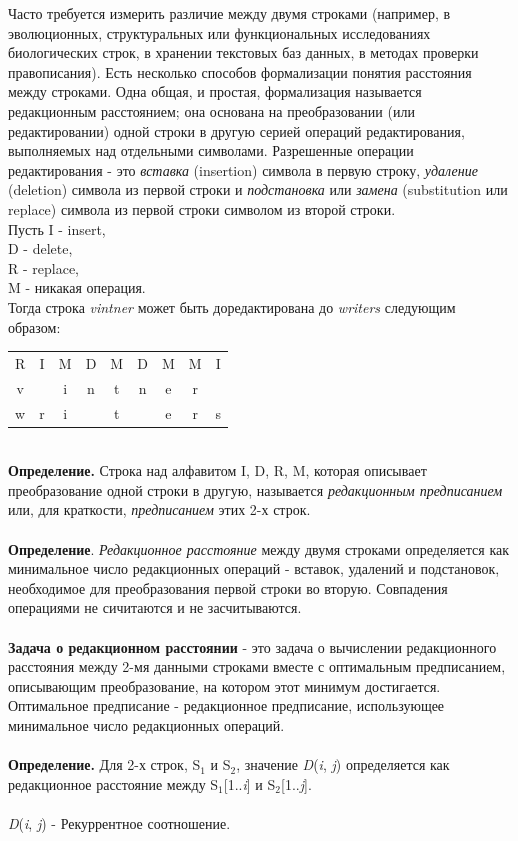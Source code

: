 \documentclass[a4paper,12pt]{article}
\begin{document}
Часто требуется измерить различие между двумя строками (например, в эволюционных, структуральных или функциональных исследованиях биологических строк, в хранении текстовых баз данных, в методах проверки правописания). Есть несколько способов формализации понятия расстояния между строками. Одна общая, и простая, формализация называется редакционным расстоянием; она основана на преобразовании (или редактировании) одной строки в другую серией операций редактирования, выполняемых над отдельными символами. Разрешенные операции редактирования - это \textit{вставка} (insertion) символа в первую строку, \textit{удаление} (deletion) символа из первой строки и \textit{подстановка} или \textit{замена} (substitution или replace) символа из первой строки символом из второй строки. \\
Пусть I - insert, \\
D - delete, \\
R - replace, \\
M - никакая операция. \\
Тогда строка \textit{vintner} может быть доредактирована до \textit{writers} следующим образом: \\
\begin{table}[h]
\begin{center}
\begin{tabular}{ccccccccc}
R & I & M & D & M & D & M & M & I \\
v & & i & n & t & n & e & r & \\
w & r & i & & t & & e & r & s \\
\end{tabular}
\end{center}
\end{table}
\\
\textbf{Определение.} Строка над алфавитом I, D, R, M, которая описывает преобразование одной строки в другую, называется \textit{редакционным предписанием} или, для краткости, \textit{предписанием} этих 2-х строк. \\
\\
\textbf{Определение}. \textit{Редакционное расстояние} между двумя строками определяется как минимальное число редакционных операций - вставок, удалений и подстановок, необходимое для преобразования первой строки во вторую. Совпадения операциями не сичитаются и не засчитываются. \\
\\
\textbf{Задача о редакционном расстоянии} - это задача о вычислении редакционного расстояния между 2-мя данными строками вместе с оптимальным  предписанием, описывающим преобразование, на котором этот минимум достигается. Оптимальное предписание - редакционное предписание, использующее минимальное число редакционных операций. \\
\\
\textbf{Определение.} Для 2-х строк, S$_1$ и S$_2$, значение \textit{D}(\textit{i}, \textit{j}) определяется как редакционное	расстояние между S$_1$[1..\textit{i}] и S$_2$[1..\textit{j}]. \\
\\
\textit{D}(\textit{i}, \textit{j}) - Рекуррентное соотношение. \\
\end{document}
